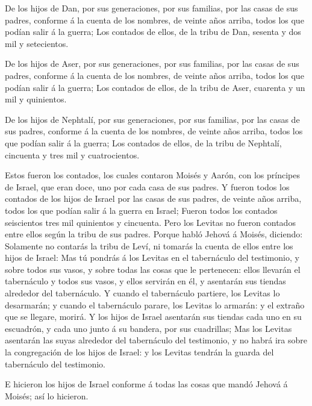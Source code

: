  De los hijos de Dan, por sus generaciones, por sus
familias, por las casas de sus padres, conforme á la cuenta de los
nombres, de veinte años arriba, todos los que podían salir á la guerra;
 Los contados de ellos, de la tribu de Dan, sesenta y dos
mil y setecientos.

 De los hijos de Aser, por sus generaciones, por sus
familias, por las casas de sus padres, conforme á la cuenta de los
nombres, de veinte años arriba, todos los que podían salir á la guerra;
 Los contados de ellos, de la tribu de Aser, cuarenta y un
mil y quinientos.

 De los hijos de Nephtalí, por sus generaciones, por sus
familias, por las casas de sus padres, conforme á la cuenta de los
nombres, de veinte años arriba, todos los que podían salir á la guerra;
 Los contados de ellos, de la tribu de Nephtalí, cincuenta
y tres mil y cuatrocientos.

 Estos fueron los contados, los cuales contaron Moisés y
Aarón, con los príncipes de Israel, que eran doce, uno por cada casa de
sus padres.  Y fueron todos los contados de los hijos de
Israel por las casas de sus padres, de veinte años arriba, todos los que
podían salir á la guerra en Israel;  Fueron todos los
contados seiscientos tres mil quinientos y cincuenta.  Pero
los Levitas no fueron contados entre ellos según la tribu de sus padres.
 Porque habló Jehová á Moisés, diciendo: 
Solamente no contarás la tribu de Leví, ni tomarás la cuenta de ellos
entre los hijos de Israel:  Mas tú pondrás á los Levitas en
el tabernáculo del testimonio, y sobre todos sus vasos, y sobre todas
las cosas que le pertenecen: ellos llevarán el tabernáculo y todos sus
vasos, y ellos servirán en él, y asentarán sus tiendas alrededor del
tabernáculo.  Y cuando el tabernáculo partiere, los Levitas
lo desarmarán; y cuando el tabernáculo parare, los Levitas lo armarán: y
el extraño que se llegare, morirá.  Y los hijos de Israel
asentarán sus tiendas cada uno en su escuadrón, y cada uno junto á su
bandera, por sus cuadrillas;  Mas los Levitas asentarán las
suyas alrededor del tabernáculo del testimonio, y no habrá ira sobre la
congregación de los hijos de Israel: y los Levitas tendrán la guarda del
tabernáculo del testimonio.

 E hicieron los hijos de Israel conforme á todas las cosas
que mandó Jehová á Moisés; así lo hicieron.


